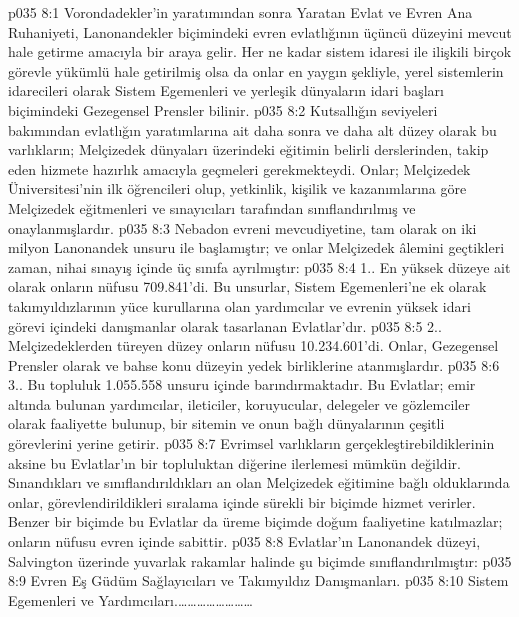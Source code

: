 \vs p035 8:1 Vorondadekler’in yaratımından sonra Yaratan Evlat ve Evren Ana Ruhaniyeti, Lanonandekler biçimindeki evren evlatlığının üçüncü düzeyini mevcut hale getirme amacıyla bir araya gelir. Her ne kadar sistem idaresi ile ilişkili birçok görevle yükümlü hale getirilmiş olsa da onlar en yaygın şekliyle, yerel sistemlerin idarecileri olarak Sistem Egemenleri ve yerleşik dünyaların idari başları biçimindeki Gezegensel Prensler bilinir.
\vs p035 8:2 Kutsallığın seviyeleri bakımından evlatlığın yaratımlarına ait daha sonra ve daha alt düzey olarak bu varlıkların; Melçizedek dünyaları üzerindeki eğitimin belirli derslerinden, takip eden hizmete hazırlık amacıyla geçmeleri gerekmekteydi. Onlar; Melçizedek Üniversitesi’nin ilk öğrencileri olup, yetkinlik, kişilik ve kazanımlarına göre Melçizedek eğitmenleri ve sınayıcıları tarafından sınıflandırılmış ve onaylanmışlardır.
\vs p035 8:3 Nebadon evreni mevcudiyetine, tam olarak on iki milyon Lanonandek unsuru ile başlamıştır; ve onlar Melçizedek âlemini geçtikleri zaman, nihai sınayış içinde üç sınıfa ayrılmıştır:
\vs p035 8:4 1.\bibnobreakspace {}. En yüksek düzeye ait olarak onların nüfusu 709.841’di. Bu unsurlar, Sistem Egemenleri’ne ek olarak takımyıldızlarının yüce kurullarına olan yardımcılar ve evrenin yüksek idari görevi içindeki danışmanlar olarak tasarlanan Evlatlar’dır.
\vs p035 8:5 2.\bibnobreakspace {}. Melçizedeklerden türeyen düzey onların nüfusu 10.234.601’di. Onlar, Gezegensel Prensler olarak ve bahse konu düzeyin yedek birliklerine atanmışlardır.
\vs p035 8:6 3.\bibnobreakspace {}. Bu topluluk 1.055.558 unsuru içinde barındırmaktadır. Bu Evlatlar; emir altında bulunan yardımcılar, ileticiler, koruyucular, delegeler ve gözlemciler olarak faaliyette bulunup, bir sitemin ve onun bağlı dünyalarının çeşitli görevlerini yerine getirir.
\vs p035 8:7 Evrimsel varlıkların gerçekleştirebildiklerinin aksine bu Evlatlar’ın bir topluluktan diğerine ilerlemesi mümkün değildir. Sınandıkları ve sınıflandırıldıkları an olan Melçizedek eğitimine bağlı olduklarında onlar, görevlendirildikleri sıralama içinde sürekli bir biçimde hizmet verirler. Benzer bir biçimde bu Evlatlar da üreme biçimde doğum faaliyetine katılmazlar; onların nüfusu evren içinde sabittir.
\vs p035 8:8 Evlatlar’ın Lanonandek düzeyi, Salvington üzerinde yuvarlak rakamlar halinde şu biçimde sınıflandırılmıştır:
\vs p035 8:9 Evren Eş Güdüm Sağlayıcıları ve Takımyıldız Danışmanları.
\vs p035 8:10 Sistem Egemenleri ve Yardımcıları.……………………

